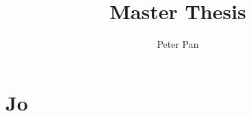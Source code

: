 \documentclass{bht-thesis}
\title{Master Thesis}
\author{Peter Pan}
\begin{document}
	\maketitle
	\section{Jo}
	\blindtext[4]

	\blindtext[2]

	\blindtext[3]
\end{document}
